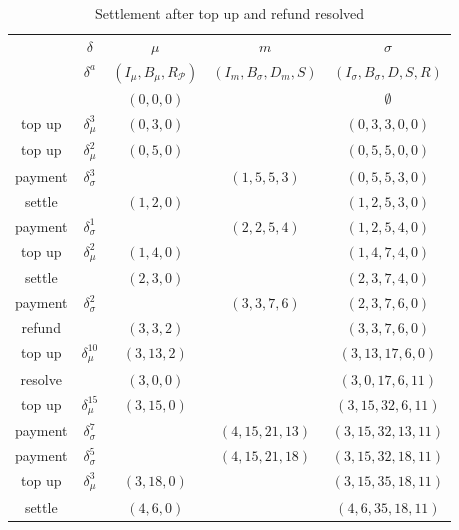 \documentclass{llncs}
\begin{document}
\begin{table}[t]
  \begin{tabularx}{\textwidth}{| S | S | C | C | C |}
       & $\delta$ & $\mu$ & $m$ & $\sigma$ \\ 
       & $\delta^a$ & $(I_\mu,B_\mu,R_\mathcal{P})$ & $(I_m,B_\sigma,D_m,S)$ & $(I_\sigma,B_\sigma,D,S,R)$ \\
  \hhline{~====}
       & & $(0,0,0)$ & & $\emptyset$ \\ 
      top up  & $\delta_\mu^3$    & $(0,3,0)$  &                & $(0,3,3,0,0)$ \\
      top up  & $\delta_\mu^2$    & $(0,5,0)$  &                & $(0,5,5,0,0)$ \\
      payment & $\delta_\sigma^3$ &            & $(1,5,5,3)$    & $(0,5,5,3,0)$ \\
      settle  &                    & $(1,2,0)$  &                & $(1,2,5,3,0)$ \\
      payment & $\delta_\sigma^1$ &            & $(2,2,5,4)$    & $(1,2,5,4,0)$ \\
      top up  & $\delta_\mu^2$    & $(1,4,0)$  &                & $(1,4,7,4,0)$ \\
      settle  &                    & $(2,3,0)$  &                & $(2,3,7,4,0)$ \\
      payment & $\delta_\sigma^2$ &            & $(3,3,7,6)$    & $(2,3,7,6,0)$ \\
      refund  &                    & $(3,3,2)$  &                & $(3,3,7,6,0)$ \\
      top up  & $\delta_\mu^{10}$   & $(3,13,2)$ &                & $(3,13,17,6,0)$ \\
      resolve &                    & $(3,0,0)$  &                & $(3,0,17,6,11)$ \\
      top up  & $\delta_\mu^{15}$   & $(3,15,0)$ &                & $(3,15,32,6,11)$ \\
      payment & $\delta_\sigma^7$ &            & $(4,15,21,13)$ & $(3,15,32,13,11)$ \\
      payment & $\delta_\sigma^5$ &            & $(4,15,21,18)$ & $(3,15,32,18,11)$ \\
      top up  & $\delta_\mu^3$    & $(3,18,0)$ &                & $(3,15,35,18,11)$ \\
      settle  &                    & $(4,6,0)$  &                & $(4,6,35,18,11)$ \\
  \end{tabularx}
  \medskip
  \caption{Settlement after top up and refund resolved}
\end{table}
\end{document}
